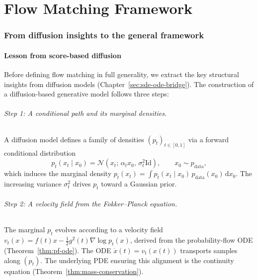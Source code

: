 \documentclass[11pt]{article}
\newcommand{\cN}{\mathcal{N}}
\newcommand{\grad}{\nabla}
\newcommand{\Id}{\mathrm{Id}}
\newcommand{\dd}{\,\mathrm{d}}
\theoremstyle{definition}
\theoremstyle{remark}
\begin{document}
\newpage

\part{Flow Matching Framework}

\section{From diffusion insights to the general framework}\label{sec:fm-framework}

\subsection{Lesson from score-based diffusion}\label{subsec:lesson-diffusion}

Before defining flow matching in full generality, we extract the key structural insights from diffusion models (Chapter~\ref{sec:sde-ode-bridge}).
The construction of a diffusion-based generative model follows three steps:

\paragraph{Step 1: A conditional path and its marginal densities.}
A diffusion model defines a family of densities $(p_t)_{t\in[0,1]}$ via a forward conditional distribution
\begin{equation}\label{eq:diff-cond-path}
p_t(x_t\mid x_0) = \cN(x_t;\,\alpha_t x_0,\,\sigma_t^2 \Id), \qquad x_0\sim p_{\mathrm{data}},
\end{equation}
which induces the marginal density $p_t(x_t) = \int p_t(x_t\mid x_0)\,p_{\mathrm{data}}(x_0)\dd x_0$.
The increasing variance $\sigma_t^2$ drives $p_t$ toward a Gaussian prior.

\paragraph{Step 2: A velocity field from the Fokker--Planck equation.}
The marginal $p_t$ evolves according to a velocity field $v_t(x) = f(t)x - \frac{1}{2}g^2(t)\grad\log p_t(x)$, derived from the probability-flow ODE (Theorem~\ref{thm:pf-ode}).
The ODE $\dot{x}(t) = v_t(x(t))$ transports samples along $(p_t)$.
The underlying PDE ensuring this alignment is the continuity equation (Theorem~\ref{thm:mass-conservation}).
\end{document}
